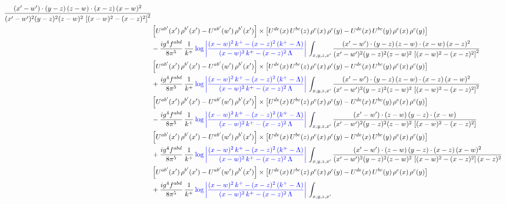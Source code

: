 \documentclass[9pt]{article}
\numberwithin{equation}{section}
\begin{document}
\begin{align}
\frac{(x'-w')\cdot(y-z)\,(z-w)\cdot(x-z)\,(x-w)^{2}}{(x'-w')^{2}(y-z)^{2}(z-w)^{2}\,\left[(x-w)^{2}-(x-z)^{2}\right]^{2}}\notag \\ & \left[U^{ab'}(x')\,\rho^{b'}(x')-U^{ab'}(w')\, \rho^{b'}(x')\right]\times \left[U^{de}(x)\,U^{bc}(z)\, \rho^{e}(x)\,\rho^{c}(y)-U^{de}(x)\,U^{bc}(y)\,\rho^{e}(x)\,\rho^{c}(y)\right]\notag \\ & 
-\frac{ig^{4}f^{abd}}{8\pi^{5}}\,\frac{1}{k^{+}}\,{\color{blue}\log{\left|\frac{(x-w)^{2}\,k^{+}-(x-z)^{2}\,(k^{+}-\Lambda)}{(x-w)^{2}\,k^{+}-(x-z)^{2}\,\Lambda}\right|}}\,\int_{x,y,z,x'}
\frac{(x'-w')\cdot(y-z)\,(z-w)\cdot(x-w)\,(x-z)^{2}}{(x'-w')^{2}(y-z)^{2}(z-w)^{2}\,\left[(x-w)^{2}-(x-z)^{2}\right]^{2}}\notag \\ & \left[U^{ab'}(x')\,\rho^{b'}(x')-U^{ab'}(w')\, \rho^{b'}(x')\right]\times \left[U^{de}(x)\,U^{bc}(z)\, \rho^{e}(x)\,\rho^{c}(y)-U^{de}(x)\,U^{bc}(y)\,\rho^{e}(x)\,\rho^{c}(y)\right]\notag \\ & +\frac{ig^{4}f^{abd}}{8\pi^{5}}\,\frac{1}{k^{+}}\,{\color{blue}\log{\left|\frac{(x-w)^{2}\,k^{+}-(x-z)^{2}\,(k^{+}-\Lambda)}{(x-w)^{2}\,k^{+}-(x-z)^{2}\,\Lambda}\right|}}\,\int_{x,y,z,x'}
\frac{(x'-w')\cdot(y-z)\,(z-w)\cdot(x-z)\,(x-w)^{2}}{(x'-w')^{2}(y-z)^{2}(z-w)^{2}\,\left[(x-w)^{2}-(x-z)^{2}\right]^{2}}\notag \\ 
&\left[U^{ab'}(x')\,\rho^{b'}(x')-U^{ab'}(w')\, \rho^{b'}(x')\right]\times \left[U^{de}(x)\,U^{bc}(z)\, \rho^{e}(x)\,\rho^{c}(y)-U^{de}(x)\,U^{bc}(y)\,\rho^{e}(x)\,\rho^{c}(y)\right]\notag \\ & -\frac{ig^{4}f^{abd}}{8\pi^{5}}\,\frac{1}{k^{+}}\,{\color{blue}\log{\left|\frac{(x-w)^{2}\,k^{+}-(x-z)^{2}\,(k^{+}-\Lambda)}{(x-w)^{2}\,k^{+}-(x-z)^{2}\,\Lambda}\right|}}\,\int_{x,y,z,x'}
\frac{(x'-w')\cdot(z-w)\,(y-z)\cdot(x-w)}{(x'-w')^{2}(y-z)^{2}(z-w)^{2}\,\left[(x-w)^{2}-(x-z)^{2}\right]}\notag \\ & \left[U^{ab'}(x')\,\rho^{b'}(x')-U^{ab'}(w')\, \rho^{b'}(x')\right]\times \left[U^{de}(x)\,U^{bc}(z)\, \rho^{e}(x)\,\rho^{c}(y)-U^{de}(x)\,U^{bc}(y)\,\rho^{e}(x)\,\rho^{c}(y)\right]\notag \\ &  +\frac{ig^{4}f^{abd}}{8\pi^{5}}\,\frac{1}{k^{+}}\,{\color{blue}\log{\left|\frac{(x-w)^{2}\,k^{+}-(x-z)^{2}\,(k^{+}-\Lambda)}{(x-w)^{2}\,k^{+}-(x-z)^{2}\,\Lambda}\right|}}\,\int_{x,y,z,x'}
\frac{(x'-w')\cdot(z-w)\,(y-z)\cdot(x-z)\,(x-w)^{2}}{(x'-w')^{2}(y-z)^{2}(z-w)^{2}\,\left[(x-w)^{2}-(x-z)^{2}\right](x-z)^{2}}\notag \\ & \left[U^{ab'}(x')\,\rho^{b'}(x')-U^{ab'}(w')\, \rho^{b'}(x')\right]\times \left[U^{de}(x)\,U^{bc}(z)\, \rho^{e}(x)\,\rho^{c}(y)-U^{de}(x)\,U^{bc}(y)\,\rho^{e}(x)\,\rho^{c}(y)\right]\notag \\ & +\frac{ig^{4}f^{abd}}{8\pi^{5}}\,\frac{1}{k^{+}}\,{\color{blue}\log{\left|\frac{(x-w)^{2}\,k^{+}-(x-z)^{2}\,(k^{+}-\Lambda)}{(x-w)^{2}\,k^{+}-(x-z)^{2}\,\Lambda}\right|}}\,\int_{x,y,z,x'}

\end{align}
\end{document}
